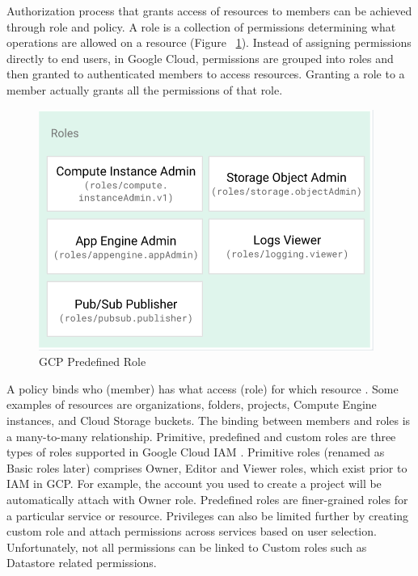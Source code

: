 \documentclass[sigconf]{acmart}
\begin{document}
Authorization process that grants access of resources to members can be achieved through role and policy. A role is a collection of permissions determining what operations are allowed on a resource (Figure ~\ref{fig:role}). Instead of assigning permissions directly to end users, in Google Cloud, permissions are grouped into roles and then granted to authenticated members to access resources. Granting a role to a member actually grants all the permissions of that role.
\begin{figure}[h]
  \centering
  \includegraphics[width=\linewidth]{pic/role}
  \caption {GCP Predefined Role}
  \label{fig:role}
\end{figure}
A policy binds who (member) has what access (role) for which resource \cite{Googlecloudiam}. Some examples of resources are organizations, folders, projects, Compute Engine instances, and Cloud Storage buckets. The binding between members and roles is a many-to-many relationship.
Primitive, predefined and custom roles are three types of roles supported in Google Cloud IAM \cite{googlecloudrole}. Primitive roles (renamed as Basic roles later) comprises Owner, Editor and Viewer roles, which exist prior to IAM in GCP. For example, the account you used to create a project will be automatically attach with Owner role. Predefined roles are finer-grained roles for a particular service or resource. Privileges can also be limited further by creating custom role and attach permissions across services based on user selection. Unfortunately, not all permissions can be linked to Custom roles such as Datastore related permissions. 
\end{document}
